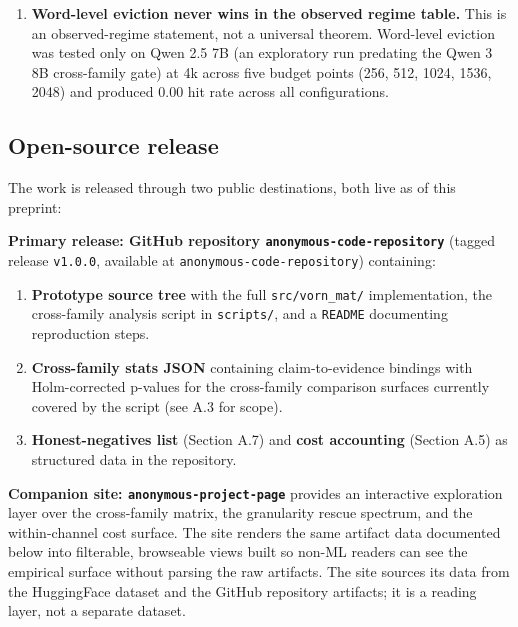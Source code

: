\documentclass[10pt]{article}
\begin{document}
\begin{enumerate}
 recovered to 1.000 under no-thinking config (Appendix C.2);
 vorn-channel data confirms threshold-bounded sentence-vorn rescue at
 MoE scale (sentence-vorn 0.020$\rightarrow$1.000 across b=256-2048).
 Attention-channel cells at b=1024 are VRAM-bounded (>80GB envelope),
 preventing direct attention-vs-vorn channel-favoritism
 classification at MoE scale. Full attention-channel MoE
 generalization is deferred.
\item
 \textbf{Word-level eviction never wins in the observed regime table.}
 This is an observed-regime statement, not a universal theorem.
 Word-level eviction was tested only on Qwen 2.5 7B (an exploratory run
 predating the Qwen 3 8B cross-family gate) at 4k across five budget
 points (256, 512, 1024, 1536, 2048) and produced 0.00 hit rate across
 all configurations.
\end{enumerate}

\subsection{Open-source release}\label{a8-open-source-release}

The work is released through two public destinations, both live as of
this preprint:

\textbf{Primary release: GitHub repository \texttt{anonymous-code-repository}}
(tagged release \texttt{v1.0.0}, available at
\texttt{anonymous-code-repository})
containing:

\begin{enumerate}
\def\labelenumi{\arabic{enumi}.}
\item
 \textbf{Prototype source tree} with the full \texttt{src/vorn\_mat/}
 implementation, the cross-family analysis script in \texttt{scripts/},
 and a \texttt{README} documenting reproduction steps.
\item
 \textbf{Cross-family stats JSON} containing claim-to-evidence bindings
 with Holm-corrected p-values for the cross-family comparison surfaces
 currently covered by the script (see A.3 for scope).
\item
 \textbf{Honest-negatives list} (Section A.7) and \textbf{cost
 accounting} (Section A.5) as structured data in the repository.
\end{enumerate}

\textbf{Companion site:
\texttt{anonymous-project-page}}
provides an interactive exploration layer over the cross-family matrix,
the granularity rescue spectrum, and the within-channel cost surface.
The site renders the same artifact data documented below into
filterable, browseable views built so non-ML readers can see the
empirical surface without parsing the raw artifacts. The site sources
its data from the HuggingFace dataset and the GitHub repository
artifacts; it is a reading layer, not a separate dataset.
\end{document}
